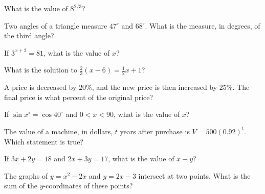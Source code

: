 \begin{exo}{}
What is the value of $8^{2/3}$?
\end{exo}
\begin{exo}{\sprtag}
Two angles of a triangle measure $47^\circ$ and $68^\circ$. What is the measure, in degrees, of the third angle?
\end{exo}
\begin{exo}{}
If $3^{x+2}=81$, what is the value of $x$?
\end{exo}
\begin{exo}[Algebra]{}
What is the solution to $\frac23(x-6)=\frac12x+1$?
\end{exo}
\begin{exo}{\sprtag}
A price is decreased by $20\%$, and the new price is then increased by $25\%$. The final price is what percent of the original price?
\end{exo}
\begin{exo}{}
If $\sin x^\circ=\cos40^\circ$ and $0<x<90$, what is the value of $x$?
\end{exo}
\begin{exo}{}
The value of a machine, in dollars, $t$ years after purchase is $V=500(0.92)^t$. Which statement is true?
\end{exo}
\begin{exo}[Algebra]{\sprtag}
If $3x+2y=18$ and $2x+3y=17$, what is the value of $x-y$?
\end{exo}
\begin{exo}{}
The graphs of $y=x^2-2x$ and $y=2x-3$ intersect at two points. What is the sum of the $y$-coordinates of these points?
\end{exo}
